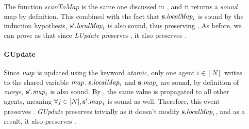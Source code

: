 The function $\mathit{scanToMap}$ is the same one discussed in , and it returns a \emph{sound} map by definition. This combined with the fact that ${\textbf{s}}.\mathit{localMap}_i$ is sound by the induction hypothesis, ${\textbf{s}}'.\mathit{localMap}_i$ is also sound, thus preserving .
As before, we can prove as that since \emph{LUpdate} preserves , it also preserves .

\paragraph{GUpdate}
Since $\mathit{\mathit{map}}$ is updated using the keyword \emph{atomic}, only one agent $i\in [N]$ writes to the shared variable $\mathit{map}$.  ${\textbf{s}}.\mathit{localMap}_i$ and ${\textbf{s}}.\mathit{map}_i$ are sound, by definition of \emph{merge}, ${\textbf{s}}'.\mathit{map}_i$ is also sound. By , the same value is propagated to all other agents, meaning $\forall j \in [N], {\textbf{s}}'.\mathit{map}_j$ is sound as well. Therefore, this event preserves . \emph{GUpdate} preserves  trivially as it doesn't modify ${\textbf{s}}.\mathit{localMap}_i$, and as a result, it also preserves .


%
%




